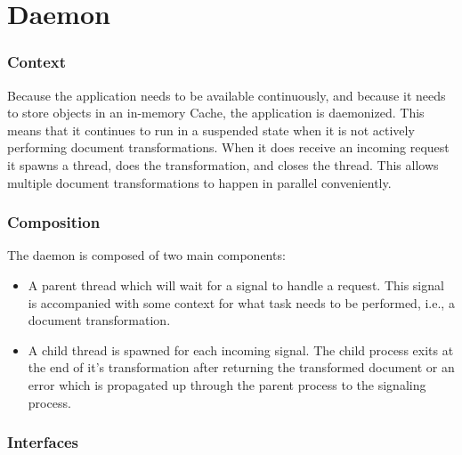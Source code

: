 \section{Daemon}
\label{daemon}

\subsubsection{Context}

Because the application needs to be available continuously, and because it needs to store objects in an in-memory Cache, the application is daemonized.
This means that it continues to run in a suspended state when it is not actively performing document transformations.
When it does receive an incoming request it spawns a thread, does the transformation, and closes the thread.
This allows multiple document transformations to happen in parallel conveniently.

\subsubsection{Composition}

The daemon is composed of two main components:

\begin{itemize}
  \item {
    A parent thread which will wait for a signal to handle a request.
    This signal is accompanied with some context for what task needs to be performed, i.e., a document transformation.
  }
  \item {
    A child thread is spawned for each incoming signal.
    The child process exits at the end of it's transformation after returning the transformed document or an error which is propagated up through the parent process to the signaling process.
  }
\end{itemize}

\subsubsection{Interfaces}

